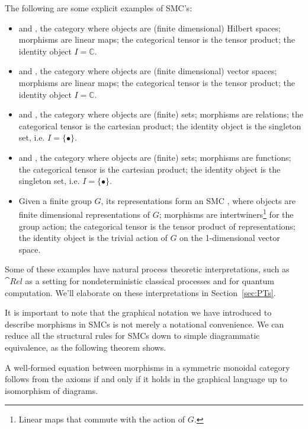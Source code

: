 \begin{examples}
\label{ex:smcs}
The following are some explicit examples of SMC's:
\begin{itemize}
\item {} and , the category where objects are (finite dimensional) Hilbert spaces; morphisms are linear maps; the categorical tensor is the tensor product; the identity object $I=\mathbb{C}$.

\item {} and , the category where objects are (finite dimensional) vector spaces; morphisms are linear maps; the categorical tensor is the tensor product; the identity object $I=\mathbb{C}$.

\item {} and , the category where objects are (finite) sets; morphisms are relations; the categorical tensor is the cartesian product; the identity object is the singleton set, i.e. $I=\{\bullet\}$.

\item {} and , the category where objects are (finite) sets; morphisms are functions; the categorical tensor is the cartesian product; the identity object is the singleton set, i.e. $I=\{\bullet\}$.

\item Given a finite group $G$, its representations form an SMC , where objects are finite dimensional representations of $G$; morphisms are intertwiners\footnote{Linear maps that commute with the action of $G$.} for the group action; the categorical tensor is the tensor product of representations; the identity object is the trivial action of $G$ on the 1-dimensional vector space.
\end{itemize}
\end{examples}

Some of these examples have natural process theoretic interpretations, such as $\cat{Rel}$ as a setting for nondeterministic classical processes and  for quantum computation. We'll elaborate on these interpretations in Section~\ref{sec:PTs}.

It is important to note that the graphical notation we have introduced to describe morphisms in SMCs is not merely a notational convenience. We can reduce all the structural rules for SMCs down to simple diagrammatic equivalence, as the following theorem shows.

\begin{theorem}{\cite[Thm 2.3]{joyal1991geometry}}
A well-formed equation between morphisms in a symmetric monoidal category follows from the axioms if and only if it holds in the graphical language up to isomorphism of diagrams.
\end{theorem}


